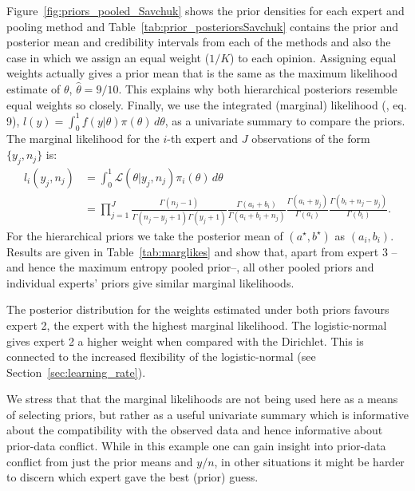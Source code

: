 \documentclass[12pt]{article}
\begin{document}
Figure~\ref{fig:priors_pooled_Savchuk} shows the prior densities for each expert and pooling method and Table~\ref{tab:prior_posteriorsSavchuk} contains the prior and posterior mean and credibility intervals from each of the methods and also the case in which we assign an equal weight ($1/K$) to each opinion.
Assigning equal weights actually gives a prior mean that is the same as the maximum likelihood estimate of $\theta$, $\hat{\theta} = 9/ 10$.
This explains why both hierarchical posteriors resemble equal weights so closely.
Finally, we use the integrated (marginal) likelihood (\textcite{Raftery2007}, eq. 9), $l(y) = \int_{0}^{1}f(y|\theta)\pi(\theta)\, d\theta$, as a univariate summary to compare the priors.
The marginal likelihood for the $i$-th expert and $J$ observations of the form $\{ y_j, n_j\}$ is:
\begin{align}
  \label{eq:marglike}
l_i(y_j, n_j) &= \int_{0}^{1}\mathcal{L}(\theta|y_j, n_j)\pi_i(\theta)\, d\theta\nonumber\\
 &= \prod_{j = 1}^{J}\frac{\Gamma(n_j-1)}{\Gamma(n_j-y_j + 1)\Gamma(y_j+1)}\frac{\Gamma(a_i + b_i)}{\Gamma(a_i + b_i + n_j)}\frac{\Gamma(a_i + y_j)}{\Gamma(a_i)}\frac{\Gamma(b_i + n_j - y_j) }{\Gamma(b_i)}.
 \end{align}
For the hierarchical priors we take the posterior mean of $(a^\star, b^\star)$ as $(a_i, b_i)$.
Results are given in Table~\ref{tab:marglikes} and show that, apart from expert $3$ -- and hence the maximum entropy pooled prior--, all other pooled priors and individual experts' priors give similar marginal likelihoods.

The posterior distribution for the weights estimated under both priors favours expert 2, the expert with the highest marginal likelihood.
The logistic-normal gives expert 2 a higher weight when compared with the Dirichlet.
This is connected to the increased flexibility of the logistic-normal (see Section~\ref{sec:learning_rate}).

We stress that that the marginal likelihoods are not being used here as a means of selecting priors, but rather as a useful univariate summary which is informative about the compatibility with the observed data and hence informative about prior-data conflict.
While in this example one can gain insight into prior-data conflict from just the prior means and $y/n$, in other situations it might be harder to discern which expert gave the best (prior) guess.
\end{document}
